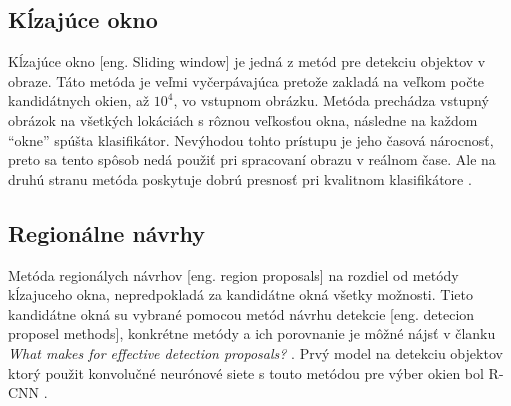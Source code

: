 \begin{comment}
    \subsubsection{Vyhľadávač na základe vizuálnej podobnosti obrázkov}
    Jednu z možných aplikácií detekcie objektov v obraze využíva Pinterest\footnote{\url{https://medium.com/@Pinterest_Engineering/introducing-automatic-object-detection-to-visual-search-e57c29191c30}}.
    Používaju detekciu objektov pre indexovanie rôznych častí obrázka.
    Týmto spôsobom si môže užívateľ pri hľadaní npr. špecifickej kabelky alebo topánok nájsť aj jej podobné.
    \begin{figure}[H]
        \centering
        \texttt{[image: purse]}
        \caption{Prototyp automatického označovania a vyhľadávania objektov\cite{odkaz:ObjectDetectionOverview}}
        \label{pic:kNN}
    \end{figure}
\end{comment}

\subsection{Kĺzajúce okno}
\label{subsec:slidingwindow}
Kĺzajúce okno [eng. Sliding window] je jedná z metód pre detekciu objektov v obraze.
Táto metóda je veľmi vyčerpávajúca pretože zakladá na veľkom počte kandidátnych okien, až $10^4$, vo vstupnom obrázku.
Metóda prechádza vstupný obrázok na všetkých lokáciách s rôznou veľkosťou okna, následne na každom ``okne'' spúšta klasifikátor.
Nevýhodou tohto prístupu je jeho časová nárocnosť, preto sa tento spôsob nedá použiť pri spracovaní obrazu v reálnom čase.
Ale na druhú stranu metóda poskytuje dobrú presnosť pri kvalitnom klasifikátore \cite{prop:AutomaticHandgunDetection}.

\subsection{Regionálne návrhy}
\label{subsec:regionproposal}
Metóda regionálych návrhov [eng. region proposals] na rozdiel od metódy kĺzajuceho okna, nepredpokladá za kandidátne okná všetky možnosti.
Tieto kandidátne okná su vybrané pomocou metód návrhu detekcie [eng. detecion proposel methods], konkrétne metódy
    a ich porovnanie je môžné nájsť v članku \textit{What makes for effective detection proposals?} \cite{prop:ProposalMethods}.
Prvý model na detekciu objektov ktorý použit konvolučné neurónové siete s touto metódou pre výber okien bol R-CNN \cite{prop:AutomaticHandgunDetection}.

